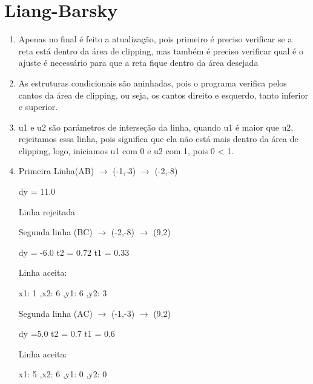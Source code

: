 \section*{Liang-Barsky}

	\begin{enumerate}\addtocounter{enumi}{27}
	
		\item 
		Apenas no final é feito a atualização, pois primeiro é preciso verificar se a reta está dentro
		da área de clipping, mas também é preciso verificar qual é o ajuste é necessário para 
		que a reta fique dentro da área desejada
		
		\item 
		As estruturas condicionais são aninhadas, pois o programa verifica pelos cantos da
		área de clipping, ou seja, os cantos direito e esquerdo, tanto inferior e superior.
		\item 
		u1 e u2 são parámetros de interseção da linha, quando u1 é maior que u2, rejeitamos
		essa linha, pois significa que ela não está mais dentro da área de clipping, logo, iniciamos
		u1 com 0 e u2 com 1, pois 0 < 1.
		\item
		
		Primeira Linha(AB) $\rightarrow$ (-1,-3) $\rightarrow$ (-2,-8)
		
		dy = 11.0

		Linha rejeitada

		Segunda linha (BC) $\rightarrow$ (-2,-8) $\rightarrow$ (9,2)

		dy = -6.0
       t2 = 0.72
       t1 = 0.33

		Linha aceita: 
		
 		x1: 1 ,x2: 6 ,y1: 6 ,y2: 3
 		
 		Segunda linha (AC) $\rightarrow$ (-1,-3) $\rightarrow$ (9,2)

		dy =5.0
       t2 = 0.7
       t1 = 0.6

		Linha aceita: 
		
		x1: 5 ,x2: 6 ,y1: 0 ,y2: 0 
		
	\end{enumerate}
